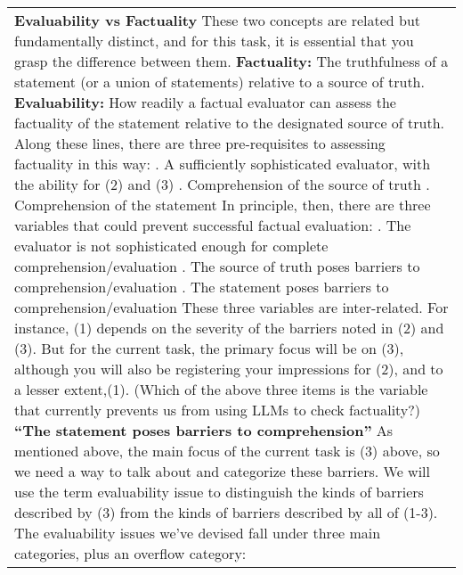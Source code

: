 \begin{table*}
\begin{tabular}{@{}p{14cm}@{}}
\textbf{Evaluability vs Factuality}
\newline
These two concepts are related but fundamentally distinct, and for this task, it is essential that you grasp the difference between them.
\newline
\newline
\textbf{Factuality:}
\newline
The truthfulness of a statement (or a union of statements) relative to a source of truth.
\newline
\newline
\textbf{Evaluability:}
How readily a factual evaluator can assess the factuality of the statement relative to the designated source of truth.
\newline
\newline
Along these lines, there are three pre-requisites to assessing factuality in this way:
\newline
\newline
1. A sufficiently sophisticated evaluator, with the ability for (2) and (3)
\newline
2. Comprehension of the source of truth
\newline
3. Comprehension of the statement
\newline
\newline
In principle, then, there are three variables that could prevent successful factual evaluation:
\newline
\newline
1. The evaluator is not sophisticated enough for complete comprehension/evaluation
\newline
2. The source of truth poses barriers to comprehension/evaluation
\newline
3. The statement poses barriers to comprehension/evaluation
\newline
\newline
These three variables are inter-related. For instance, (1) depends on the severity of the barriers noted in (2) and (3). But for the current task, the primary focus will be on (3), although you will also be registering your impressions for (2), and to a lesser extent,(1). (Which of the above three items is the variable that currently prevents us from using LLMs to check factuality?)
\newline
\newline
\textbf{“The statement poses barriers to comprehension”}
\newline
\newline
As mentioned above, the main focus of the current task is (3) above, so we need a way to talk about and categorize these barriers. We will use the term evaluability issue to distinguish the kinds of barriers described by (3) from the kinds of barriers described by all of (1-3). The evaluability issues we've devised fall under three main categories, plus an overflow category:

\end{tabular}
\end{table*}
